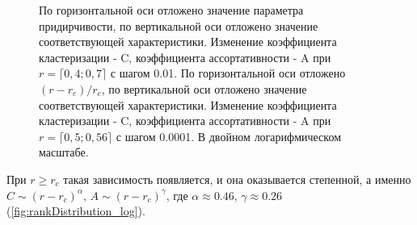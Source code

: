 \documentclass[10pt,aps,pra]{revtex4-1}
\begin{document}
            \begin{figure}[H]  
                \centering

                \caption{
                    \label{fig:baCharacteristic}
                     По горизонтальной оси отложено значение параметра придирчивости, по вертикальной оси отложено значение соответствующей характеристики. Изменение коэффициента кластеризации - C, коэффициента ассортативности - A при $r=\lceil 0,4; 0,7 \rceil$ с шагом 0.01. 
                     По горизонтальной оси отложено $(r-r_c)/r_c$, по вертикальной оси отложено значение соответствующей характеристики. Изменение коэффициента кластеризации - C, коэффициента ассортативности - A при $r=\lceil 0,5; 0,56 \rceil$ с шагом 0.0001. В двойном логарифмическом масштабе.
                }
            \end{figure}

        При $r \geq r_c$ такая зависимость появляется, и она оказывается степенной, а именно $C \sim {(r-r_c)}^\alpha$, $A \sim {(r-r_c)}^\gamma$, где $\alpha \approx 0.46$, $\gamma \approx 0.26$ (\ref{fig:rankDistribution_log}).
\end{document}
